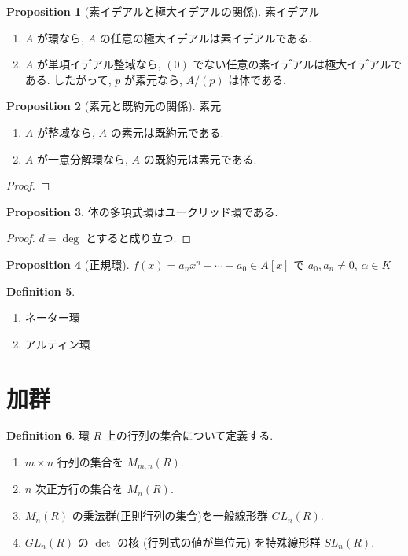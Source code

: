 \documentclass[a4paper,dvipdfmx]{jsarticle}
\theoremstyle{plain}
\theoremstyle{definition}
\theoremstyle{plain}
\numberwithin{equation}{section}
\numberwithin{theorem}{section}
\numberwithin{definition}{section}
\numberwithin{note}{section}
\theoremstyle{definition}
\newtheorem{dfn}{Definition}[section]
\newtheorem{prop}[dfn]{Proposition}
\begin{document}
\begin{prop}[素イデアルと極大イデアルの関係]
  素イデアル
  \begin{enumerate}
    \item $A$ が環なら, $A$ の任意の極大イデアルは素イデアルである.
    \item $A$ が単項イデアル整域なら, $(0)$ でない任意の素イデアルは極大イデアルである. したがって, $p$ が素元なら, $A/(p)$ は体である.
  \end{enumerate}
\end{prop}
\begin{prop}[素元と既約元の関係]
  素元
  \begin{enumerate}
    \item $A$ が整域なら, $A$ の素元は既約元である.
    \item $A$ が一意分解環なら, $A$ の既約元は素元である.
  \end{enumerate}
\end{prop}
\begin{proof}

\end{proof}

\begin{prop}
  体の多項式環はユークリッド環である.
\end{prop}
\begin{proof}
  $d = \deg$ とすると成り立つ.
\end{proof}

\begin{prop}[正規環]
  $f(x) = a_nx^n + \cdots + a_0\in A[x]$ で $a_0, a_n \neq 0$, $\alpha\in K$
\end{prop}

\begin{dfn}
  \begin{enumerate}
    \item ネーター環
    \item アルティン環
  \end{enumerate}
\end{dfn}

\section{加群}
\begin{dfn}
  環 $R$ 上の行列の集合について定義する.
  \begin{enumerate}
    \item $m\times n$ 行列の集合を $M_{m,n}(R)$.
    \item $n$ 次正方行の集合を $M_n(R)$.
    \item $M_n(R)$ の乗法群(正則行列の集合)を一般線形群 $GL_n(R)$.
    \item $GL_n(R)$ の $\det$ の核 (行列式の値が単位元) を特殊線形群 $SL_n(R)$.
  \end{enumerate}
\end{dfn}
\end{document}
